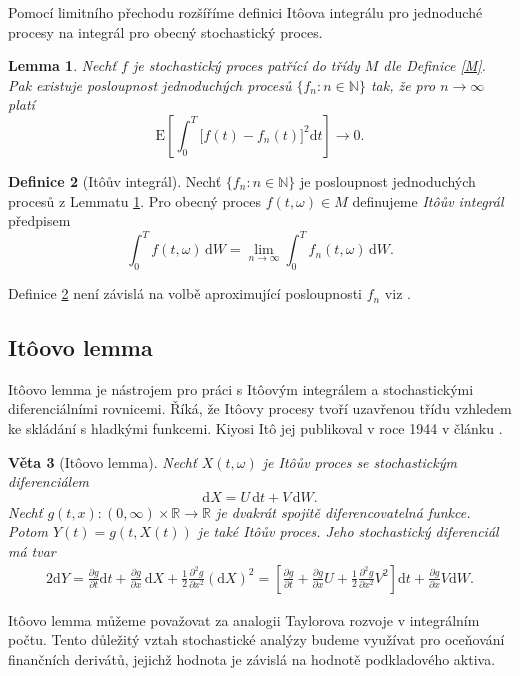 \documentclass[a4paper,12pt]{report}
\newtheorem{veta}{Věta}
\newtheorem{lemma}[veta]{Lemma}
\theoremstyle{definition} \newtheorem{definice}[veta]{Definice}
\theoremstyle{remark}
\begin{document}
Pomocí limitního přechodu rozšíříme definici It\^oova integrálu pro jednoduché procesy na integrál pro obecný stochastický proces.

\begin{lemma} \label{itoint}
Nechť $f$ je stochastický proces patřící do třídy $M$ dle Definice \ref{M}.
Pak existuje posloupnost jednoduchých procesů $\{f_n:n\in\mathbb N\}$ tak, že pro $n\to\infty$ platí
$$\mathrm{E}\left[\int_0^T\big[f(t)-f_n(t)\big]^2\mathrm{d}t\right]\longrightarrow0.$$
\end{lemma}

\begin{definice}[It\^oův integrál]\label{Ito_int}
Nechť $\{f_n:n\in\mathbb N\}$ je posloupnost jednoduchých procesů z Lemmatu \ref{itoint}.
Pro obecný proces $f(t,\omega)\in M$ definujeme \textit{It\^oův integrál} předpisem
$$\int_0^Tf(t,\omega)\,\mathrm{d}W=\lim_{n\to\infty}\int_0^Tf_n(t,\omega)\,\mathrm{d}W.$$
\end{definice}
Definice \ref{Ito_int} není závislá na volbě aproximující posloupnosti $f_n$ viz \cite{oksendal2003stochastic}.

\subsection{It\^oovo lemma}
It\^oovo lemma je nástrojem pro práci s It\^oovým integrálem a stochastickými diferenciálními rovnicemi.
Říká, že It\^oovy procesy tvoří uzavřenou třídu vzhledem ke skládání s hladkými funkcemi.
Kiyosi It\^o jej publikoval v roce 1944 v článku \cite{ito1944}.
\begin{veta}[It\^oovo lemma]\label{ito_lemma}
Nechť $X(t,\omega)$ je It\^oův proces se stochastickým diferenciálem
$$\mathrm{d}X=U\,\mathrm{d}t+V\,\mathrm{d}W.$$
Nechť $g(t,x):(0,\infty)\times\mathbb R\to\mathbb R$ je dvakrát spojitě diferencovatelná funkce.
Potom $Y(t)=g(t,X(t))$ je také It\^oův proces.
Jeho stochastický diferenciál má tvar
\begin{alignat*}{2}
\mathrm{d}Y=\frac{\partial g}{\partial t}\mathrm{d}t+\frac{\partial g}{\partial x}\,\mathrm{d}X+\frac12\frac{\partial^2 g}{\partial x^2}(\mathrm{d}X)^2=\left[\frac{\partial g}{\partial t}+\frac{\partial g}{\partial x}U+\frac12\frac{\partial^2 g}{\partial x^2}V^2\right]\mathrm{d}t+\frac{\partial g}{\partial x}V\mathrm{d}W.
\end{alignat*}
\end{veta}

It\^oovo lemma můžeme považovat za analogii Taylorova rozvoje v integrálním počtu.
Tento důležitý vztah stochastické analýzy budeme využívat pro oceňování finančních derivátů, jejichž hodnota je závislá na hodnotě podkladového aktiva.
\end{document}
